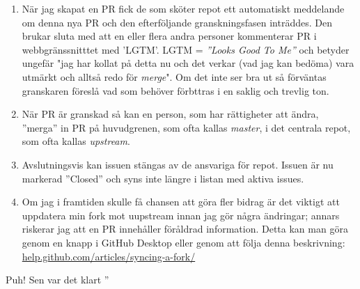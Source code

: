 \begin{enumerate}
\item När jag skapat en PR fick de som sköter repot ett automatiskt meddelande om denna nya PR och den efterföljande granskningsfasen inträddes. Den brukar sluta med att en eller flera andra personer kommenterar PR i webbgränssnitttet med 'LGTM'. LGTM = \emph{''Looks Good To Me''} och betyder ungefär "jag har kollat på detta nu och det verkar (vad jag kan bedöma) vara utmärkt och alltså redo för \emph{merge}". Om det inte ser bra ut så förväntas granskaren föreslå vad som behöver förbttras i en saklig och trevlig ton.

\item När PR är granskad så kan en person, som har rättigheter att ändra, ''merga'' in PR på huvudgrenen, som ofta kallas \emph{master}, i det centrala repot, som ofta kallas \emph{upstream}.

\item Avslutningsvis kan issuen stängas av de ansvariga för repot. Issuen är nu markerad ''Closed'' och syns inte längre i listan med aktiva issues. 

\item Om jag i framtiden skulle få chansen att göra fler bidrag är det viktigt att uppdatera min fork mot uupstream innan jag gör några ändringar; annars riskerar jag att en PR innehåller föråldrad information. Detta kan man göra genom en knapp i GitHub Desktop eller genom att följa denna beskrivning: \href{https://help.github.com/articles/syncing-a-fork/}{help.github.com/articles/syncing-a-fork/}

\end{enumerate}

Puh! Sen var det klart \code{:)} ''
